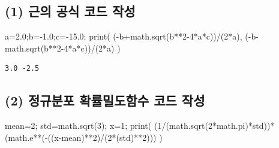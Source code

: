\documentclass[
  letterpaper,
  DIV=11,
  numbers=noendperiod]{scrreprt}
\newenvironment{Shaded}{\begin{snugshade}}{\end{snugshade}}
\newcommand{\BuiltInTok}[1]{\textcolor[rgb]{0.00,0.23,0.31}{#1}}
\newcommand{\DecValTok}[1]{\textcolor[rgb]{0.68,0.00,0.00}{#1}}
\newcommand{\FloatTok}[1]{\textcolor[rgb]{0.68,0.00,0.00}{#1}}
\newcommand{\NormalTok}[1]{\textcolor[rgb]{0.00,0.23,0.31}{#1}}
\newcommand{\OperatorTok}[1]{\textcolor[rgb]{0.37,0.37,0.37}{#1}}
\begin{document}
\subsection*{(1) 근의 공식 코드
작성}\label{uxadfcuxc758-uxacf5uxc2dd-uxcf54uxb4dc-uxc791uxc131}

\begin{Shaded}
\begin{Highlighting}[]
\NormalTok{a}\OperatorTok{=}\FloatTok{2.0}\OperatorTok{;}\NormalTok{b}\OperatorTok{={-}}\FloatTok{1.0}\OperatorTok{;}\NormalTok{c}\OperatorTok{={-}}\FloatTok{15.0}\OperatorTok{;}
\BuiltInTok{print}\NormalTok{(}
\NormalTok{    (}\OperatorTok{{-}}\NormalTok{b}\OperatorTok{+}\NormalTok{math.sqrt(b}\OperatorTok{**}\DecValTok{2}\OperatorTok{{-}}\DecValTok{4}\OperatorTok{*}\NormalTok{a}\OperatorTok{*}\NormalTok{c))}\OperatorTok{/}\NormalTok{(}\DecValTok{2}\OperatorTok{*}\NormalTok{a),}
\NormalTok{    (}\OperatorTok{{-}}\NormalTok{b}\OperatorTok{{-}}\NormalTok{math.sqrt(b}\OperatorTok{**}\DecValTok{2}\OperatorTok{{-}}\DecValTok{4}\OperatorTok{*}\NormalTok{a}\OperatorTok{*}\NormalTok{c))}\OperatorTok{/}\NormalTok{(}\DecValTok{2}\OperatorTok{*}\NormalTok{a)}
\NormalTok{)}
\end{Highlighting}
\end{Shaded}

\begin{verbatim}
3.0 -2.5
\end{verbatim}

\subsection*{(2) 정규분포 확률밀도함수 코드
작성}\label{uxc815uxaddcuxbd84uxd3ec-uxd655uxb960uxbc00uxb3c4uxd568uxc218-uxcf54uxb4dc-uxc791uxc131}

\begin{Shaded}
\begin{Highlighting}[]
\NormalTok{mean}\OperatorTok{=}\DecValTok{2}\OperatorTok{;}\NormalTok{ std}\OperatorTok{=}\NormalTok{math.sqrt(}\DecValTok{3}\NormalTok{)}\OperatorTok{;}\NormalTok{ x}\OperatorTok{=}\DecValTok{1}\OperatorTok{;}
\BuiltInTok{print}\NormalTok{(}
\NormalTok{    (}\DecValTok{1}\OperatorTok{/}\NormalTok{(math.sqrt(}\DecValTok{2}\OperatorTok{*}\NormalTok{math.pi)}\OperatorTok{*}\NormalTok{std))}\OperatorTok{*}\NormalTok{(math.e}\OperatorTok{**}\NormalTok{(}\OperatorTok{{-}}\NormalTok{((x}\OperatorTok{{-}}\NormalTok{mean)}\OperatorTok{**}\DecValTok{2}\NormalTok{)}\OperatorTok{/}\NormalTok{(}\DecValTok{2}\OperatorTok{*}\NormalTok{(std)}\OperatorTok{**}\DecValTok{2}\NormalTok{)))}
\NormalTok{)}
\end{Highlighting}
\end{Shaded}
\end{document}
